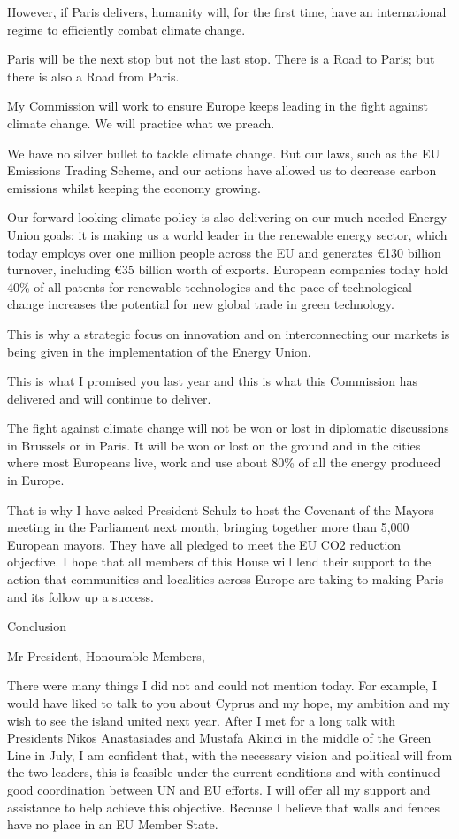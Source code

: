 \documentclass[a4paper,11pt]{article}
\begin{document}
However, if Paris delivers, humanity will, for the first time, have an international regime to efficiently combat climate change.

Paris will be the next stop but not the last stop. There is a Road to Paris; but there is also a Road from Paris.

My Commission will work to ensure Europe keeps leading in the fight against climate change. We will practice what we preach.

We have no silver bullet to tackle climate change. But our laws, such as the EU Emissions Trading Scheme, and our actions have allowed us to decrease carbon emissions whilst keeping the economy growing.

Our forward-looking climate policy is also delivering on our much needed Energy Union goals: it is making us a world leader in the renewable energy sector, which today employs over one million people across the EU and generates \euro130 billion turnover, including \euro35 billion worth of exports. European companies today hold 40\% of all patents for renewable technologies and the pace of technological change increases the potential for new global trade in green technology.

This is why a strategic focus on innovation and on interconnecting our markets is being given in the implementation of the Energy Union.

This is what I promised you last year and this is what this Commission has delivered and will continue to deliver.

The fight against climate change will not be won or lost in diplomatic discussions in Brussels or in Paris. It will be won or lost on the ground and in the cities where most Europeans live, work and use about 80\% of all the energy produced in Europe.

That is why I have asked President Schulz to host the Covenant of the Mayors meeting in the Parliament next month, bringing together more than 5,000 European mayors. They have all pledged to meet the EU CO2 reduction objective. I hope that all members of this House will lend their support to the action that communities and localities across Europe are taking to making Paris and its follow up a success.

 

Conclusion

Mr President, Honourable Members,

There were many things I did not and could not mention today. For example, I would have liked to talk to you about Cyprus and my hope, my ambition and my wish to see the island united next year. After I met for a long talk with Presidents Nikos Anastasiades and Mustafa Akinci in the middle of the Green Line in July, I am confident that, with the necessary vision and political will from the two leaders, this is feasible under the current conditions and with continued good coordination between UN and EU efforts. I will offer all my support and assistance to help achieve this objective. Because I believe that walls and fences have no place in an EU Member State.
\end{document}
